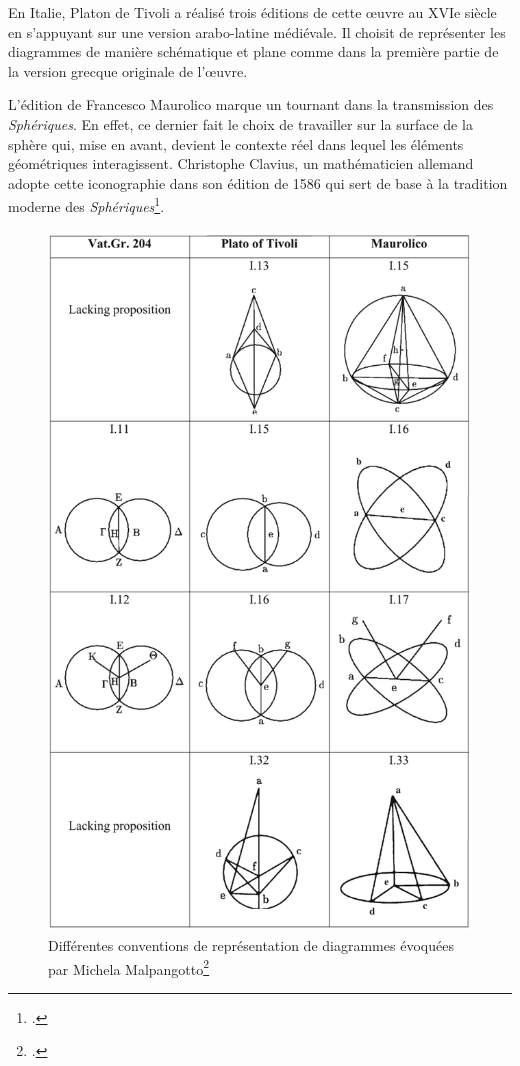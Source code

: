 En Italie, Platon de Tivoli a réalisé trois éditions de cette œuvre au XVIe siècle en s'appuyant sur une version arabo-latine médiévale. Il choisit de représenter les diagrammes de manière schématique et plane comme dans la première partie de la version grecque originale de l'œuvre. 

L'édition de Francesco Maurolico marque un tournant dans la transmission des \textit{Sphériques}. En effet, ce dernier fait le choix de travailler sur la surface de la sphère qui, mise en avant, devient le contexte réel dans lequel les éléments géométriques interagissent. Christophe Clavius, un mathématicien allemand adopte cette iconographie dans son édition de 1586 qui sert de base à la tradition moderne des \textit{Sphériques}\footcite{malpangottoGraphicalChoicesGeometrical2010}. 

\begin{figure}[h]
	\centering
	\includegraphics[width=0.9\linewidth]{images/conventions_diagrammes.png}
	\caption{Différentes conventions de représentation de diagrammes évoquées par Michela Malpangotto\footcite{malpangottoGraphicalChoicesGeometrical2010}}
	\label{fig:conventions}
\end{figure}


